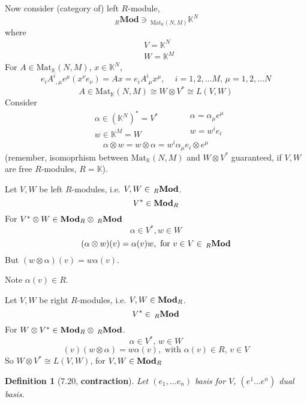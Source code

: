 \documentclass[10pt]{amsart}
\newtheorem{definition}{Definition}
\begin{document}
\begin{multicols*}{2}
Now consider (category of) left $R$-module, 
\begin{equation}
{\,}_R\textbf{Mod} \ni {\,}_{\text{Mat}_{\mathbb{K}}(N,M) } \mathbb{K}^N
\end{equation}
where
\[
\begin{aligned}
	& V=\mathbb{K}^N \\ 
&	  W = \mathbb{K}^M
\end{aligned}
\]
For $A\in \text{Mat}_{\mathbb{K}}(N,M)$, $x\in \mathbb{K}^N$, 
\[
e_i A^i_{ \,\ , \mu} e^{\mu}(x^{\nu} e_{\nu}) = Ax = e_iA^i_{\,\, \mu} x^{\mu} , \quad \, i=1,2,\dots M, \, \mu = 1,2, \dots N
\]
\[
A\in \text{Mat}_{\mathbb{K}}(N,M) \cong W\otimes V^* \cong L(V,W)
\]
Consider 
\[
\begin{aligned}
	& \alpha \in (\mathbb{K}^N)^* = V^* \\
	& w\in \mathbb{K}^M = W
\end{aligned} \qquad \, \begin{aligned}
	& \alpha = \alpha_{\mu} e^{\mu} \\ 
	& w=w^ie_i
\end{aligned}
\]
\[
\alpha \otimes w = w \otimes \alpha = w^i\alpha_{\mu} e_i \otimes e^{\mu}
\]
(remember, isomoprhism between $\text{Mat}_{\mathbb{K}}(N,M)$ and $W\otimes V^*$ guaranteed, if $V,W$ are free $R$-modules, $R=\mathbb{K}$).

Let $V,W$ be left $R$-modules, i.e. $V,W \in {\,}_R\text{\textbf{Mod}}$.  
\[
V^* \in \text{\textbf{Mod}}_R
\]
For $V^*\otimes W \in \text{\textbf{Mod}}_R\otimes {\,}_R\text{\textbf{Mod}}$  
\[
\alpha \in V^*, w\in W
\]
\[
(\alpha \otimes w)(v) = \alpha(v)w, \text{ for } v\in V \in {\,}_R\text{\textbf{Mod}}
\]
But $(w\otimes \alpha)(v) = w\alpha(v)$.  

Note $\alpha(v) \in R$.  

Let $V,W$ be right $R$-modules, i.e. $V,W \in \text{\textbf{Mod}}_R$.  
\[
V^* \in {\,}_R\text{\textbf{Mod}}
\]
For $W\otimes V^* \in \text{\textbf{Mod}}_R \otimes {\,}_R\text{\textbf{Mod}}$.  
\[
\alpha \in V^*, \, w\in W
\]
\[
(v)(w\otimes \alpha) = w\alpha(v), \text{ with } \alpha(v)\in R, \, v\in V
\]
So $W\otimes V^* \cong L(V,W)$, for $V,W\in \text{\textbf{Mod}}_R$

\begin{definition}[7.20\cite{JLee2009}, \textbf{contraction}]
Let $(e_1,\dots e_n)$ basis for $V$, $(e^1\dots e^n)$ dual basis.  


\end{definition}
\end{multicols*}
\end{document}
